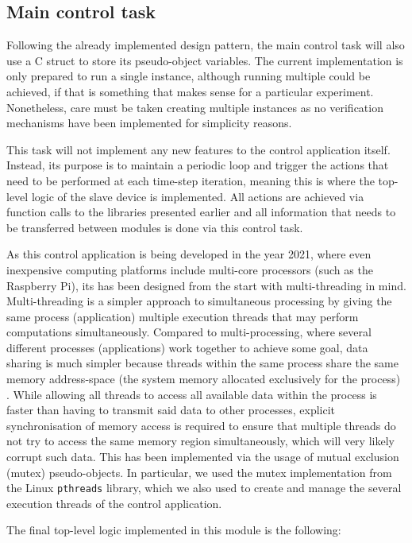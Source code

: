 \subsection{Main control task}
Following the already implemented design pattern, the main control task will also use a C struct to store its pseudo-object variables.
The current implementation is only prepared to run a single instance, although running multiple could be achieved, if that is something that makes sense for a particular experiment.
Nonetheless, care must be taken creating multiple instances as no verification mechanisms have been implemented for simplicity reasons.

This task will not implement any new features to the control application itself.
Instead, its purpose is to maintain a periodic loop and trigger the actions that need to be performed at each time-step iteration, meaning this is where the top-level logic of the slave device is implemented.
All actions are achieved via function calls to the libraries presented earlier and all information that needs to be transferred between modules is done via this control task.

As this control application is being developed in the year 2021, where even inexpensive computing platforms include multi-core processors (such as the Raspberry Pi), its has been designed from the start with multi-threading in mind.
Multi-threading is a simpler approach to simultaneous processing by giving the same process (application) multiple execution threads that may perform computations simultaneously.
Compared to multi-processing, where several different processes (applications) work together to achieve some goal, data sharing is much simpler because threads within the same process share the same memory address-space (the system memory allocated exclusively for the process) \cite{technology:mp-vs-mt}.
While allowing all threads to access all available data within the process is faster than having to transmit said data to other processes, explicit synchronisation of memory access is required to ensure that multiple threads do not try to access the same memory region simultaneously, which will very likely corrupt such data.
This has been implemented via the usage of mutual exclusion (mutex) pseudo-objects.
In particular, we used the mutex implementation from the Linux \verb|pthreads| library, which we also used to create and manage the several execution threads of the control application.

The final top-level logic implemented in this module is the following:

